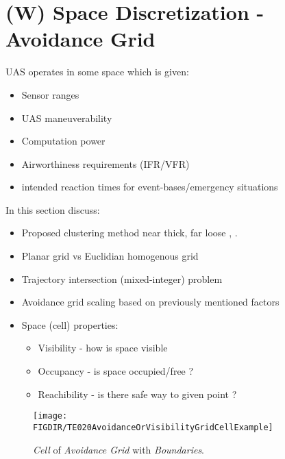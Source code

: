 \section{(W) Space Discretization - Avoidance Grid}\label{s:AvoidanceGrid}
    \noindent UAS operates in some space which is given:
    \begin{itemize}
        \item Sensor ranges
        \item UAS maneuverability
        \item Computation power
        \item Airworthiness requirements (IFR/VFR)
        \item intended reaction times for event-bases/emergency situations
    \end{itemize}
    \noindent In this section discuss:
    \begin{itemize}
    	\item Proposed clustering method near thick, far loose , \cite{zaiane2002clustering}.
        \item Planar grid vs Euclidian homogenous grid
        \item Trajectory intersection (mixed-integer) problem
        \item Avoidance grid scaling based on previously mentioned factors
        \item Space (cell) properties:
        \begin{itemize}
            \item Visibility - how is space visible
            \item Occupancy - is space occupied/free ?
            \item Reachibility - is there safe way to given point ?
        \end{itemize}
    \end{itemize}
    \begin{figure}[H]
        \centering
        \texttt{[image: \\FIGDIR/TE020AvoidanceOrVisibilityGridCellExample]} 
        \caption{\emph{Cell} of \emph{Avoidance Grid} with \emph{Boundaries}.}
        \label{fig:cellBoundariesInAvoidanceGrid}
    \end{figure}
